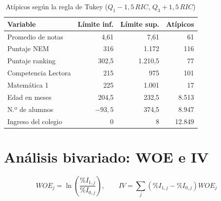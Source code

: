 \documentclass[11pt]{article}
\newif\ifborrador
\newcommand{\redactar}[1]{\ifborrador
  \begin{tcolorbox}[colback=red!4,colframe=red!60!black,fonttitle=\bfseries\small,
    title=Redactar (lo escribe el grupo),breakable,left=4pt,right=4pt,top=1pt,bottom=1pt]
  \small #1\end{tcolorbox}\fi}
\newcommand{\cod}[1]{\texttt{\detokenize{#1}}}
\begin{document}
\begin{table}[H]
\centering
\caption{Atípicos según la regla de Tukey ($Q_1 - 1{,}5\,RIC$, $Q_3 + 1{,}5\,RIC$)}
\label{tab:tukey}
\begin{tabular}{l r r r}
\toprule
\textbf{Variable} & \textbf{Límite inf.} & \textbf{Límite sup.} & \textbf{Atípicos} \\
\midrule
Promedio de notas & 4,61 & 7,61 & 61 \\
Puntaje NEM & 316 & 1.172 & 116 \\
Puntaje ranking & 302,5 & 1.210,5 & 77 \\
Competencia Lectora & 215 & 975 & 101 \\
Matemática 1 & 225 & 1.001 & 17 \\
Edad en meses & 204,5 & 232,5 & 8.513 \\
N.º de alumnos & $-93{,}5$ & 374,5 & 8.947 \\
Ingreso del colegio & 0 & 8 & 12.849 \\
\bottomrule
\end{tabular}
\end{table}

\section{Análisis bivariado: WOE e IV}

\redactar{(1) Convención: \cod{scorecard} calcula $WOE_j = \ln(\%I_{1,j} / \%I_{0,j})$, así que un WOE positivo indica un tramo con más matrícula en el top 3 que el promedio. (2) Fórmula del IV y escala de Siddiqi (inútil $< 0{,}02$; débil $0{,}02$--$0{,}1$; medio $0{,}1$--$0{,}3$; fuerte $0{,}3$--$0{,}5$; sospechoso $> 0{,}5$). (3) Comentar la tabla \ref{tab:iv}: qué sale por IV $< 0{,}02$ y por qué Lectora y M1 se quedan aunque sean «sospechosas» (el puntaje es la base de la selección, no es una fuga de información). (4) Monotonía: solo edad y N.º de alumnos no lo son.}

\[
WOE_j = \ln\!\left(\frac{\%I_{1,j}}{\%I_{0,j}}\right), \qquad
IV = \sum_j \left(\%I_{1,j} - \%I_{0,j}\right) WOE_j
\]
\end{document}
